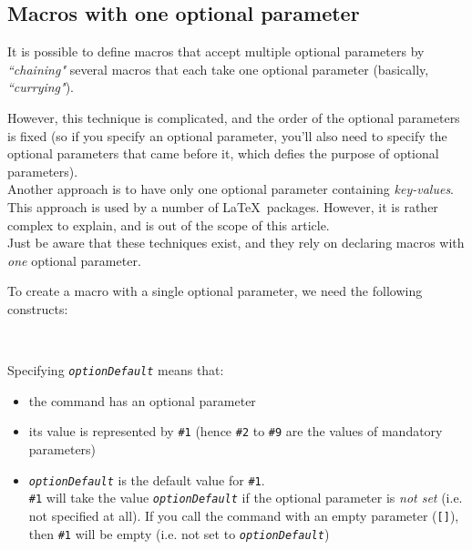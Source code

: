\subsection{Macros with one optional parameter} \label{macro-optional-parameter}


\begin{note}
It is possible to define macros that accept multiple optional parameters by \emph{``chaining"} several macros that each take one optional parameter (basically, \emph{``currying"}). 

However, this technique is complicated, and the order of the optional parameters is fixed (so if you specify an optional parameter, you'll also need to specify the optional parameters that came before it, which defies the purpose of optional parameters). \\

Another approach is to have only one optional parameter containing \emph{key-values}. This approach is used by a number of \LaTeX\ packages. However, it is rather complex to explain, and is out of the scope of this article. \\

Just be aware that these techniques exist, and they rely on declaring macros with \emph{one} optional parameter.
\end{note}

To create a macro with a single optional parameter, we need the following constructs:



\begin{description}
	\setlength{\itemsep}{-0.5em}
	
	\item[\quoteCmd{newcommand}\texttt{\{\textbackslash \emph{cmd}\}[\emph{nbArgs}][\emph{optionDefault}]\{\emph{definition}\}}] \mbox{}
	\item[\quoteCmd{newcommand*}\texttt{\{\textbackslash \emph{cmd}\}[\emph{nbArgs}][\emph{optionDefault}]\{\emph{definition}\}}] \mbox{} \\
\end{description}


Specifying \texttt{\emph{optionDefault}} means that:

\begin{itemize}
	\item the command has an optional parameter
	\item its value is represented by \texttt{\#1} (hence \texttt{\#2} to \texttt{\#9} are the values of mandatory parameters)
	\item \texttt{\emph{optionDefault}} is the default value for \texttt{\#1}. \\
	\texttt{\#1} will take the value \texttt{\emph{optionDefault}} if the optional parameter is \emph{not set} (i.e. not specified at all). If you call the command with an empty parameter (\texttt{[]}), then \texttt{\#1} will be empty (i.e. not set to \texttt{\emph{optionDefault}})
\end{itemize}

